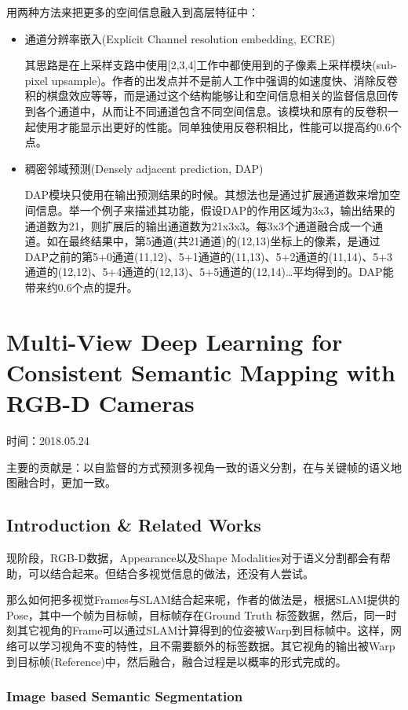 用两种方法来把更多的空间信息融入到高层特征中：
\begin{itemize}
\item 通道分辨率嵌入(Explicit Channel resolution embedding, ECRE)

其思路是在上采样支路中使用[2,3,4]工作中都使用到的子像素上采样模块(sub-pixel upsample)。作者的出发点并不是前人工作中强调的如速度快、消除反卷积的棋盘效应等等，而是通过这个结构能够让和空间信息相关的监督信息回传到各个通道中，从而让不同通道包含不同空间信息。该模块和原有的反卷积一起使用才能显示出更好的性能。同单独使用反卷积相比，性能可以提高约0.6个点。

\item 稠密邻域预测(Densely adjacent prediction, DAP)

DAP模块只使用在输出预测结果的时候。其想法也是通过扩展通道数来增加空间信息。举一个例子来描述其功能，假设DAP的作用区域为3x3，输出结果的通道数为21，则扩展后的输出通道数为21x3x3。每3x3个通道融合成一个通道。如在最终结果中，第5通道(共21通道)的(12,13)坐标上的像素，是通过DAP之前的第5+0通道(11,12)、5+1通道的(11,13)、5+2通道的(11,14)、5+3通道的(12,12)、5+4通道的(12,13)、5+5通道的(12,14)…平均得到的。DAP能带来约0.6个点的提升。

\end{itemize}

\section{Multi-View Deep Learning for Consistent Semantic Mapping with RGB-D Cameras}

{\color{red} 时间：2018.05.24}

主要的贡献是：以自监督的方式预测多视角一致的语义分割，在与关键帧的语义地图融合时，更加一致。

\subsection{Introduction \& Related Works}
现阶段，RGB-D数据，Appearance以及Shape Modalities对于语义分割都会有帮助，可以结合起来。但结合多视觉信息的做法，还没有人尝试。

那么如何把多视觉Frames与SLAM结合起来呢，作者的做法是，根据SLAM提供的Pose，其中一个帧为目标帧，目标帧存在Ground Truth 标签数据，然后，同一时刻其它视角的Frame可以通过SLAM计算得到的位姿被Warp到目标帧中。这样，网络可以学习视角不变的特性，且不需要额外的标签数据。其它视角的输出被Warp到目标帧(Reference)中，然后融合，融合过程是以概率的形式完成的。

\subsubsection{Image based Semantic Segmentation}

